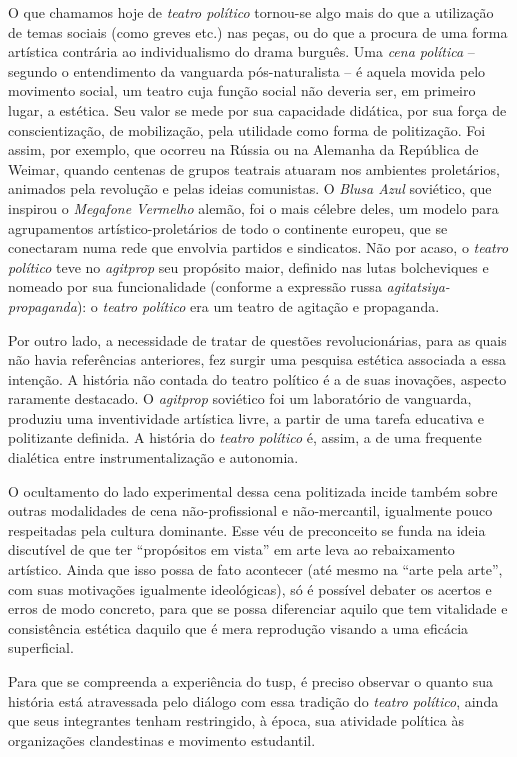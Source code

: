 O que chamamos hoje de {\it teatro político} tornou-se algo mais do que
a utilização de temas sociais (como greves etc.) nas peças, ou do que a
procura de uma forma artística contrária ao individualismo do drama
burguês. Uma {\it cena política} -- segundo o entendimento da vanguarda
pós-naturalista -- é aquela movida pelo movimento social, um teatro cuja
função social não deveria ser, em primeiro lugar, a estética. Seu valor
se mede por sua capacidade didática, por sua força de conscientização,
de mobilização, pela utilidade como forma de politização. Foi assim, por
exemplo, que ocorreu na Rússia ou na Alemanha da República de Weimar,
quando centenas de grupos teatrais atuaram nos ambientes proletários,
animados pela revolução e pelas ideias comunistas. O {\it Blusa Azul}
soviético, que inspirou o {\it Megafone Vermelho} alemão, foi o mais
célebre deles, um modelo para agrupamentos artístico-proletários de todo
o continente europeu, que se conectaram numa rede que envolvia partidos
e sindicatos. Não por acaso, o {\it teatro político} teve no
{\it agitprop} seu propósito maior, definido nas lutas bolcheviques e
nomeado por sua funcionalidade (conforme a expressão russa
{\it agitatsiya-propaganda}): o {\it teatro político} era um teatro de
agitação e propaganda.

Por outro lado, a necessidade de tratar de questões revolucionárias,
para as quais não havia referências anteriores, fez surgir uma pesquisa
estética associada a essa intenção. A história não contada do teatro
político é a de suas inovações, aspecto raramente destacado. O
{\it agitprop} soviético foi um laboratório de vanguarda, produziu uma
inventividade artística livre, a partir de uma tarefa educativa e
politizante definida. A história do {\it teatro político} é, assim, a de
uma frequente dialética entre instrumentalização e autonomia.

O ocultamento do lado experimental dessa cena politizada incide também
sobre outras modalidades de cena não-profissional e não-mercantil,
igualmente pouco respeitadas pela cultura dominante. Esse véu de
preconceito se funda na ideia discutível de que ter “propósitos em
vista” em arte leva ao rebaixamento artístico. Ainda que isso possa de
fato acontecer (até mesmo na “arte pela arte”, com suas motivações
igualmente ideológicas), só é possível debater os acertos e erros de
modo concreto, para que se possa diferenciar aquilo que tem vitalidade e
consistência estética daquilo que é mera reprodução visando a uma
eficácia superficial.

Para que se compreenda a experiência do {\sc tusp}, é preciso observar o
quanto sua história está atravessada pelo diálogo com essa tradição do
{\it teatro político}, ainda que seus integrantes tenham restringido, à
época, sua atividade política às organizações clandestinas e movimento
estudantil.

